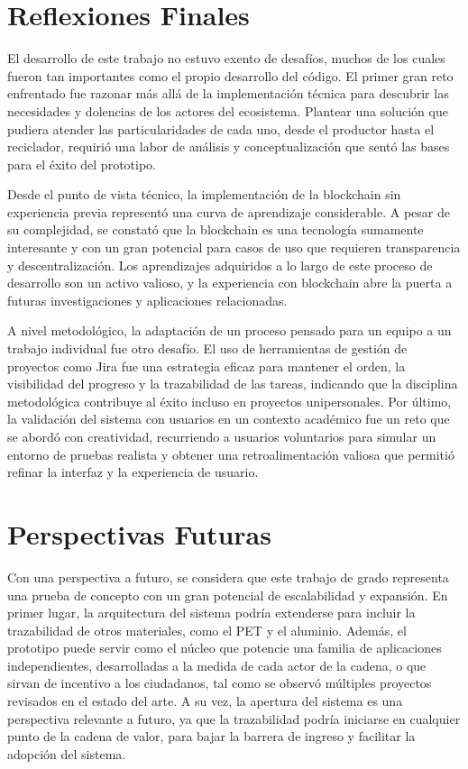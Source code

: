 \section{Reflexiones Finales}

El desarrollo de este trabajo no estuvo exento de desafíos, muchos de los cuales fueron tan importantes como el propio desarrollo del código. El primer gran reto enfrentado fue razonar más allá de la implementación técnica para descubrir las necesidades y dolencias de los actores del ecosistema. Plantear una solución que pudiera atender las particularidades de cada uno, desde el productor hasta el reciclador, requirió una labor de análisis y conceptualización que sentó las bases para el éxito del prototipo.

Desde el punto de vista técnico, la implementación de la blockchain sin experiencia previa representó una curva de aprendizaje considerable. A pesar de su complejidad, se constató que la blockchain es una tecnología sumamente interesante y con un gran potencial para casos de uso que requieren transparencia y descentralización. Los aprendizajes adquiridos a lo largo de este proceso de desarrollo son un activo valioso, y la experiencia con blockchain abre la puerta a futuras investigaciones y aplicaciones relacionadas.

A nivel metodológico, la adaptación de un proceso pensado para un equipo a un trabajo individual fue otro desafío. El uso de herramientas de gestión de proyectos como Jira fue una estrategia eficaz para mantener el orden, la visibilidad del progreso y la trazabilidad de las tareas, indicando que la disciplina metodológica contribuye al éxito incluso en proyectos unipersonales. Por último, la validación del sistema con usuarios en un contexto académico fue un reto que se abordó con creatividad, recurriendo a usuarios voluntarios para simular un entorno de pruebas realista y obtener una retroalimentación valiosa que permitió refinar la interfaz y la experiencia de usuario.

\section{Perspectivas Futuras}

Con una perspectiva a futuro, se considera que este trabajo de grado representa una prueba de concepto con un gran potencial de escalabilidad y expansión. En primer lugar, la arquitectura del sistema podría extenderse para incluir la trazabilidad de otros materiales, como el PET y el aluminio. Además, el prototipo puede servir como el núcleo que potencie una familia de aplicaciones independientes, desarrolladas a la medida de cada actor de la cadena, o que sirvan de incentivo a los ciudadanos, tal como se observó múltiples proyectos revisados en el estado del arte. A su vez, la apertura del sistema es una perspectiva relevante a futuro, ya que la trazabilidad podría iniciarse en cualquier punto de la cadena de valor, para bajar la barrera de ingreso y facilitar la adopción del sistema.


